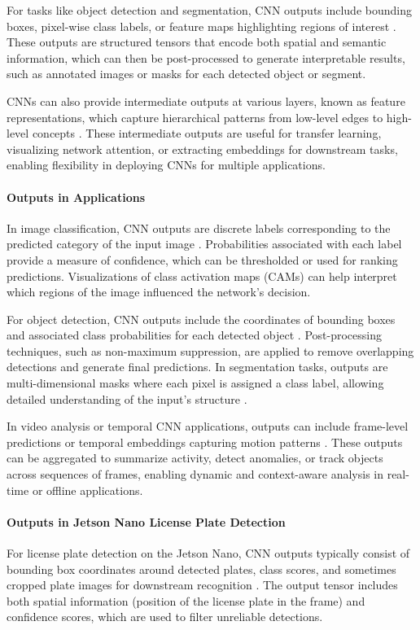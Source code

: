 For tasks like object detection and segmentation, CNN outputs include bounding boxes, pixel-wise class labels, or feature maps highlighting regions of interest \cite{ren2015faster, ronneberger2015u}. These outputs are structured tensors that encode both spatial and semantic information, which can then be post-processed to generate interpretable results, such as annotated images or masks for each detected object or segment.

CNNs can also provide intermediate outputs at various layers, known as feature representations, which capture hierarchical patterns from low-level edges to high-level concepts \cite{krizhevsky2012imagenet}. These intermediate outputs are useful for transfer learning, visualizing network attention, or extracting embeddings for downstream tasks, enabling flexibility in deploying CNNs for multiple applications.

\paragraph{Outputs in Applications}
In image classification, CNN outputs are discrete labels corresponding to the predicted category of the input image \cite{goodfellow2016deep}. Probabilities associated with each label provide a measure of confidence, which can be thresholded or used for ranking predictions. Visualizations of class activation maps (CAMs) can help interpret which regions of the image influenced the network’s decision.

For object detection, CNN outputs include the coordinates of bounding boxes and associated class probabilities for each detected object \cite{ren2015faster}. Post-processing techniques, such as non-maximum suppression, are applied to remove overlapping detections and generate final predictions. In segmentation tasks, outputs are multi-dimensional masks where each pixel is assigned a class label, allowing detailed understanding of the input’s structure \cite{ronneberger2015u}.

In video analysis or temporal CNN applications, outputs can include frame-level predictions or temporal embeddings capturing motion patterns \cite{pinto2022springer}. These outputs can be aggregated to summarize activity, detect anomalies, or track objects across sequences of frames, enabling dynamic and context-aware analysis in real-time or offline applications.

\paragraph{Outputs in Jetson Nano License Plate Detection}
For license plate detection on the Jetson Nano, CNN outputs typically consist of bounding box coordinates around detected plates, class scores, and sometimes cropped plate images for downstream recognition \cite{jetsonpytorch, pytorchdocs}. The output tensor includes both spatial information (position of the license plate in the frame) and confidence scores, which are used to filter unreliable detections.

